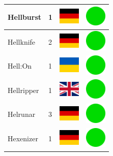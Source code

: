 \documentclass[12pt, a4paper, twoside]{report}
\begin{document}
\begin{center}
\begin{longtable}{|p{5cm}|p{2cm}|p{2cm}|p{2cm}|}
			Hellburst & 1 & \includegraphics[width=1cm]{4x3/de} & \includegraphics[width=1cm]{likes/y} \\ \hline
			Hellknife & 2 & \includegraphics[width=1cm]{4x3/de} & \includegraphics[width=1cm]{likes/y} \\ \hline
			Hell:On & 1 & \includegraphics[width=1cm]{4x3/ua} & \includegraphics[width=1cm]{likes/y} \\ \hline
			Hellripper & 1 & \includegraphics[width=1cm]{4x3/gb} & \includegraphics[width=1cm]{likes/y} \\ \hline
			Helrunar & 3 & \includegraphics[width=1cm]{4x3/de} & \includegraphics[width=1cm]{likes/y} \\ \hline
			Hexenizer & 1 & \includegraphics[width=1cm]{4x3/de} & \includegraphics[width=1cm]{likes/y} \\ \hline

\end{longtable}
\end{center}
\end{document}
